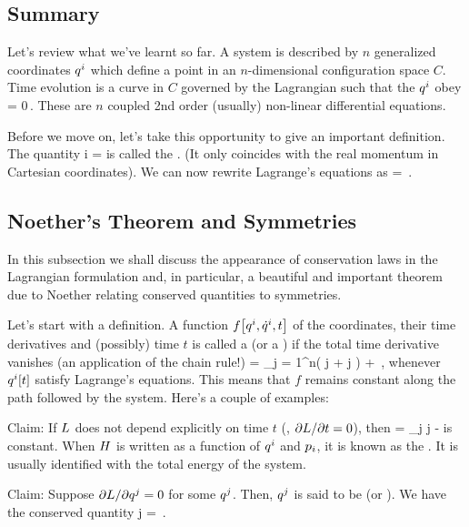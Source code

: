 \subsection{Summary}
Let's review what we've learnt so far. A system is described by $n$ generalized coordinates ${q}^{i}$ which define a point in an $n$-dimensional configuration space $C$. Time evolution is a curve in $C$ governed by the Lagrangian 
\beq
\lag{}
\eeq
such that the ${q}^{i}$ obey
\beq
{} = 0\,.
\eeq
These are $n$ coupled 2nd order (usually) non-linear differential equations. 

Before we move on, let's take this opportunity to give an important definition. The quantity
\beq
\gmom i = 
\eeq
is called the . (It only coincides with the real momentum in Cartesian coordinates). We can now rewrite Lagrange's equations as
\beq
{} = \,.
\eeq


\subsection{Noether's Theorem and Symmetries}
In this subsection we shall discuss the appearance of conservation laws in the Lagrangian formulation and, in particular, a beautiful and important theorem due to Noether relating conserved quantities to symmetries.

Let's start with a definition. A function $f\!\left[{{q}^{i}, {\dot{q}}^{i}, t}\right]$ of the coordinates, their time derivatives and (possibly) time $t$ is called a  (or a ) if the total time derivative vanishes (an application of the chain rule!)
\beq
{} = \sum_{j = 1}^{n}\left( \gvel j + \gacc j \right) + \,,
\eeq
whenever ${q}^{i}\!\left[{t}\right]$ satisfy Lagrange's equations. This means that $f$ remains constant along the path followed by the system. Here's a couple of examples:

Claim: If $L$ does not depend explicitly on time $t$ (\ie, $\partial L/\partial t = 0$), then
\beq
\ham = \sum_j \gvel j - \lag
\eeq
is constant. When $H$ is written as a function of ${q}^{i}$ and ${p}_{i}$, it is known as the . It is usually identified with the total energy of the system.

Claim: Suppose $\partial L/\partial{q}^{j} = 0$ for some ${q}^{j}$. Then, ${q}^{j}$ is said to be  (or ). We have the conserved quantity
\beq
\gmom j = \,.
\eeq

